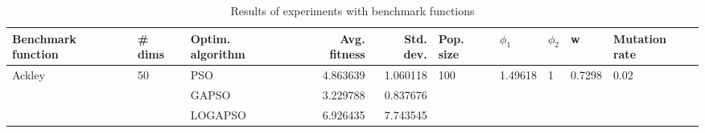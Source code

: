 \begin{table}
\centering
\caption{Results of experiments with benchmark functions}
\begin{tabular}{lllrrlllll}
\toprule
     Benchmark function &             \# dims & Optim. algorithm &  Avg. fitness &  Std. dev. &            Pop. size &               $\phi_{1}$ &         $\phi_{2}$ &                       w &         Mutation rate \\
\midrule
\multirow{3}{*}{Ackley} & \multirow{3}{*}{50} &              PSO &      4.863639 &   1.060118 & \multirow{3}{*}{100} & \multirow{3}{*}{1.49618} & \multirow{3}{*}{1} & \multirow{3}{*}{0.7298} & \multirow{3}{*}{0.02} \\
                        &                     &            GAPSO &      3.229788 &   0.837676 &                      &                          &                    &                         &                       \\
                        &                     &          LOGAPSO &      6.926435 &   7.743545 &                      &                          &                    &                         &                       \\
\bottomrule
\end{tabular}
\end{table}
